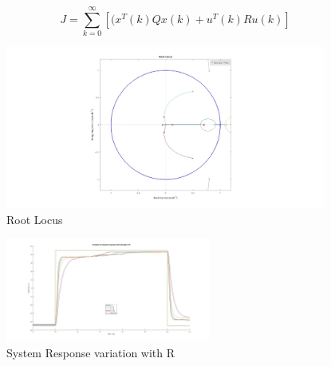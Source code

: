 \begin{minipage}{0.3\textwidth}
    \fontsmall
    \begin{equation}
        J = \sum_{k=0}^{\infty} \left[ (x^{T}(k)Qx(k) + u^{T}(k)Ru(k)\right]
        \label{eq:cost_function}
    \end{equation}
\end{minipage}
\hfill
\begin{minipage}{0.75\textwidth}    
    \begin{figure}[H]
        \centering
        \includegraphics[width=0.94\textwidth]{Figs/root_locus.jpg}
        \caption{Root Locus}
        \label{fig:Square Root locus of the system}
    \end{figure}
\end{minipage}


\begin{figure}
    \centering
    \includegraphics[width=0.6\textwidth]{Figs/system_response_variation_with_R.jpg}
    \caption{System Response variation with R}
    \label{fig: system response variation with changes in R} 
\end{figure}